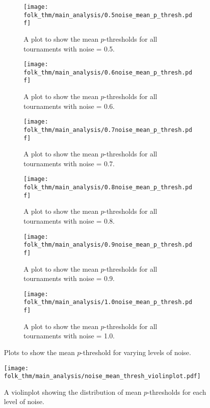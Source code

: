 \begin{figure}
    \begin{subfigure}{.3\textwidth}
        \centering
        \texttt{[image: folk\_thm/main\_analysis/0.5noise\_mean\_p\_thresh.pdf]}
        \caption{A plot to show the mean \(p\)-thresholds for all tournaments with noise = 0.5.}\label{subfig:0.5noise_mean_p_thresh}
    \end{subfigure}
    \begin{subfigure}{.3\textwidth}
        \centering
        \texttt{[image: folk\_thm/main\_analysis/0.6noise\_mean\_p\_thresh.pdf]}
        \caption{A plot to show the mean \(p\)-thresholds for all tournaments with noise = 0.6.}\label{subfig:0.6noise_mean_p_thresh}
    \end{subfigure}
    \begin{subfigure}{.3\textwidth}
        \centering
        \texttt{[image: folk\_thm/main\_analysis/0.7noise\_mean\_p\_thresh.pdf]}
        \caption{A plot to show the mean \(p\)-thresholds for all tournaments with noise = 0.7.}\label{subfig:0.7noise_mean_p_thresh}
    \end{subfigure}
    \begin{subfigure}{.3\textwidth}
        \centering
        \texttt{[image: folk\_thm/main\_analysis/0.8noise\_mean\_p\_thresh.pdf]}
        \caption{A plot to show the mean \(p\)-thresholds for all tournaments with noise = 0.8.}\label{subfig:0.8noise_mean_p_thresh}
    \end{subfigure}
    \begin{subfigure}{.3\textwidth}
        \centering
        \texttt{[image: folk\_thm/main\_analysis/0.9noise\_mean\_p\_thresh.pdf]}
        \caption{A plot to show the mean \(p\)-thresholds for all tournaments with noise = 0.9.}\label{subfig:0.9noise_mean_p_thresh}
    \end{subfigure}
    \begin{subfigure}{.3\textwidth}
        \centering
        \texttt{[image: folk\_thm/main\_analysis/1.0noise\_mean\_p\_thresh.pdf]}
        \caption{A plot to show the mean \(p\)-thresholds for all tournaments with noise = 1.0.}\label{subfig:1.0noise_mean_p_thresh}
    \end{subfigure}
    \caption{Plots to show the mean \(p\)-threshold for varying levels of noise.}\label{fig:noise_mean_p_thresh}
\end{figure}

\begin{figure}
    \centering
    \texttt{[image: folk\_thm/main\_analysis/noise\_mean\_thresh\_violinplot.pdf]}
    \caption{A violinplot showing the distribution of mean \(p\)-thresholds for each level of noise.}\label{fig:noise_mean_thresh_violinplot}
\end{figure}



